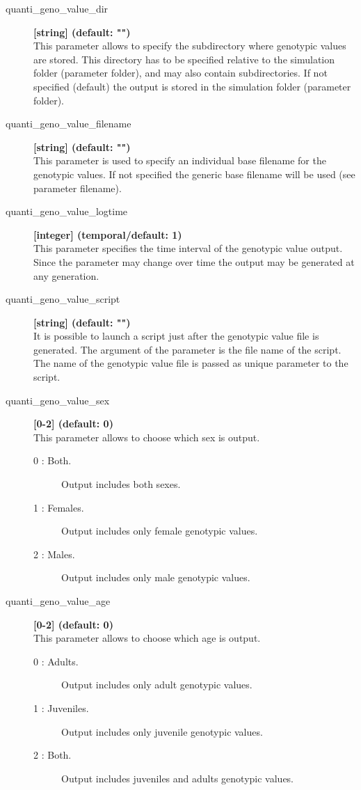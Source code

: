 \documentclass[letterpaper,12pt,oneside]{book}
\begin{document}
\begin{description}
\item[quanti\_geno\_value\_dir] \textbf{[string] (default: "")}\\
This parameter allows to specify the subdirectory where genotypic values are stored. This directory has to be specified relative to the simulation folder (parameter \textsf{folder}), and may also contain subdirectories. If not specified (default) the output is stored in the simulation folder (parameter \textsf{folder}).

\item[quanti\_geno\_value\_filename] \textbf{[string] (default: "")}\\
This parameter is used to specify an individual base filename for the genotypic values. If not specified the generic base filename will be used (see parameter \textsf{filename}).

\item[quanti\_geno\_value\_logtime] \textbf{[integer] (temporal/default: 1)}\\
This parameter specifies the time interval of the genotypic value output. Since the parameter may change over time the output may be generated at any generation.

\item[quanti\_geno\_value\_script] \textbf{[string] (default: "")}\\
It is possible to launch a script just after the genotypic value file is generated. The argument of the parameter is the file name of the script. The name of the genotypic value file is passed as unique parameter to the script. 

\item[quanti\_geno\_value\_sex] \textbf{[0-2] (default: 0)}\\
This parameter allows to choose which sex is output. 
\begin{description}
\item [0 : Both.] Output includes both sexes.
\item [1 : Females.] Output includes only female genotypic values.
\item [2 : Males.] Output includes only male genotypic values.
\end{description}

\item[quanti\_geno\_value\_age] \textbf{[0-2] (default: 0)}\\
This parameter allows to choose which age is output.  
\begin{description}
\item [0 : Adults.] Output includes only adult genotypic values.
\item [1 : Juveniles.] Output includes only juvenile genotypic values.
\item [2 : Both.] Output includes juveniles and adults genotypic values.
\end{description}
\end{description}
\end{document}
